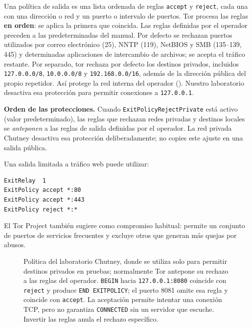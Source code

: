 Una política de salida es una lista ordenada de reglas \texttt{accept} y \texttt{reject}, cada una con una dirección o red y un puerto o intervalo de puertos. Tor procesa las reglas \textbf{en orden}: se aplica la primera que coincida. Las reglas definidas por el operador preceden a las predeterminadas del manual. Por defecto se rechazan puertos utilizados por correo electrónico (25), NNTP (119), NetBIOS y SMB (135--139, 445) y determinadas aplicaciones de intercambio de archivos; se acepta el tráfico restante. Por separado, tor rechaza por defecto los destinos privados, incluidos \texttt{127.0.0.0/8}, \texttt{10.0.0.0/8} y \texttt{192.168.0.0/16}, además de la dirección pública del propio repetidor. Así protege la red interna del operador (). Nuestro laboratorio desactiva esa protección para permitir conexiones a \texttt{127.0.0.1}.

\textbf{Orden de las protecciones.} Cuando \texttt{ExitPolicyRejectPrivate} está activo (valor predeterminado), las reglas que rechazan redes privadas y destinos locales se \emph{anteponen} a las reglas de salida definidas por el operador. La red privada Chutney desactiva esa protección deliberadamente; no copies este ajuste en una salida pública.

Una salida limitada a tráfico web puede utilizar:
\begin{lstlisting}[numbers=none]
ExitRelay  1
ExitPolicy accept *:80
ExitPolicy accept *:443
ExitPolicy reject *:*
\end{lstlisting}

El Tor Project también sugiere  como compromiso habitual: permite un conjunto de puertos de servicios frecuentes y excluye otros que generan más quejas por abusos.

\begin{figure}[htbp]
\centering

\caption{Política del laboratorio Chutney, donde  se utiliza solo para permitir destinos privados en pruebas; normalmente Tor antepone su rechazo a las reglas del operador. \texttt{BEGIN} hacia \texttt{127.0.0.1:8080} coincide con \texttt{reject} y produce \texttt{END EXITPOLICY}; el puerto 8081 omite esa regla y coincide con \texttt{accept}. La aceptación permite intentar una conexión TCP, pero no garantiza \texttt{CONNECTED} sin un servidor que escuche. Invertir las reglas anula el rechazo específico.}
\label{fig:policy}
\end{figure}


